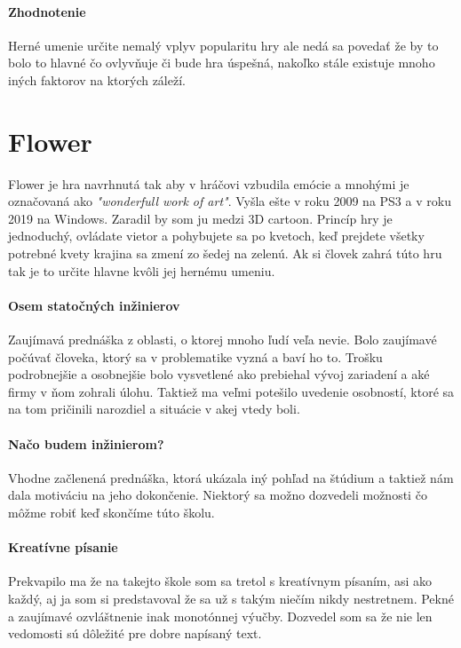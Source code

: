 \documentclass[10pt,twoside,slovak,a4paper]{article}
\begin{document}
\paragraph{Zhodnotenie}
Herné umenie určite nemalý vplyv popularitu hry ale nedá sa povedať že by to bolo to hlavné čo ovlyvňuje či bude hra úspešná, nakoľko stále existuje mnoho iných faktorov na ktorých záleží. 

\section{Flower}
\cite{8944678}
Flower je hra  navrhnutá tak aby v hráčovi vzbudila emócie a mnohými je označovaná ako \emph{"wonderfull work of art"}. Vyšla ešte v roku 2009 na PS3 a v roku 2019 na Windows. Zaradil by som ju medzi 3D cartoon. Princíp hry je jednoduchý, ovládate vietor a pohybujete sa po kvetoch, keď prejdete všetky potrebné kvety krajina sa zmení zo šedej na zelenú. Ak si človek zahrá túto hru tak je to určite hlavne kvôli jej hernému umeniu.

\paragraph{Osem statočných inžinierov}
Zaujímavá prednáška z oblasti, o ktorej mnoho ľudí veľa nevie. Bolo zaujímavé počúvať človeka, ktorý sa v problematike vyzná a baví ho to. Trošku podrobnejšie a osobnejšie bolo vysvetlené ako prebiehal vývoj zariadení a aké firmy v ňom zohrali úlohu. Taktiež ma veľmi potešilo uvedenie osobností, ktoré sa na tom pričinili narozdiel a situácie v akej vtedy boli.
\paragraph{Načo budem inžinierom?}
Vhodne začlenená prednáška, ktorá ukázala iný pohľad na štúdium a taktiež nám dala motiváciu na jeho dokončenie. Niektorý sa možno dozvedeli možnosti čo môžme robiť keď skončíme túto školu.
\paragraph{Kreatívne písanie}
Prekvapilo ma že na takejto škole som sa tretol s kreatívnym písaním, asi ako každý, aj ja som si predstavoval že sa už s takým niečím nikdy nestretnem. Pekné a zaujímavé ozvláštnenie inak monotónnej výučby. Dozvedel som sa že nie len vedomosti sú dôležité pre dobre napísaný text.
\end{document}
